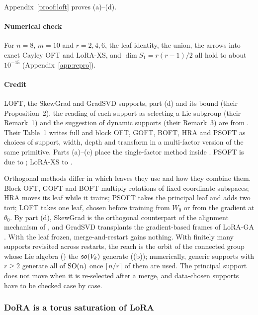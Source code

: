 Appendix~\ref{proof:loft} proves (a)--(d).

\paragraph{Numerical check}
For $n=8$, $m=10$ and $r=2,4,6$, the leaf identity, the union, the arrows into exact Cayley OFT and LoRA-XS, and
$\dim S_1=r(r-1)/2$ all hold to about $10^{-15}$ (Appendix~\ref{app:repro}).

\paragraph{Credit}
LOFT, the SkewGrad and GradSVD supports, part (d) and its bound (their Proposition~2), the reading of each support as
selecting a Lie subgroup (their Remark~1) and the suggestion of dynamic supports (their Remark~3) are from
\citet{zhao2026loft}. Their Table~1 writes full and block OFT, GOFT, BOFT, HRA and PSOFT as choices of support, width,
depth and transform in a multi-factor version of the same primitive. Parts (a)--(c) place the single-factor method inside
. PSOFT is due to \citet{wu2025efficient}; LoRA-XS to \citet{baazy2024lora}.

\begin{explains}
Orthogonal methods differ in which leaves they use and how they combine them. Block OFT, GOFT and BOFT multiply rotations
of fixed coordinate subspaces; HRA moves its leaf while it trains; PSOFT takes the principal leaf and adds two tori; LOFT
takes one leaf, chosen before training from $W_0$ or from the gradient at $\theta_0$. By part (d), SkewGrad is the
orthogonal counterpart of the alignment mechanism of , and GradSVD transplants the
gradient-based frames of LoRA-GA \citep{wang2024lorab}. With the leaf frozen, merge-and-restart gains nothing. With
finitely many supports revisited across restarts, the reach is the orbit of the connected group whose Lie algebra
() the $\mathfrak{so}(V_k)$ generate ((b)); numerically, generic supports with $r\ge2$ generate all
of $\mathrm{SO}(n)$ once $\lceil n/r\rceil$ of them are used. The principal support does not move when it is re-selected after
a merge, and data-chosen supports have to be checked case by case.
\end{explains}

\subsubsection{DoRA is a torus saturation of LoRA}\label{sec:erlangen-dora}

